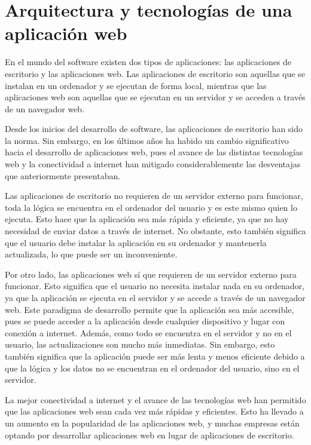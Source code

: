 \section{Arquitectura y tecnologías de una aplicación web}
\label{sec:arquitectura_sistema}

En el mundo del software existen dos tipos de aplicaciones: las aplicaciones de escritorio y las aplicaciones web. Las aplicaciones de escritorio son aquellas que se instalan en un ordenador y se ejecutan de forma local, mientras que las aplicaciones web son aquellas que se ejecutan en un servidor y se acceden a través de un navegador web.

Desde los inicios del desarrollo de software, las aplicaciones de escritorio han sido la norma. Sin embargo, en los últimos años ha habido un cambio significativo hacia el desarrollo de aplicaciones web, pues el avance de las distintas tecnologías web y la conectividad a internet han mitigado considerablemente las desventajas que anteriormente presentaban. \cite{evo_web}

Las aplicaciones de escritorio no requieren de un servidor externo para funcionar, toda la lógica se encuentra en el ordenador del usuario y es este mismo quien lo ejecuta. Esto hace que la aplicación sea más rápida y eficiente, ya que no hay necesidad de enviar datos a través de internet. No obstante, esto también significa que el usuario debe instalar la aplicación en su ordenador y mantenerla actualizada, lo que puede ser un inconveniente. \cite{web_vs_desktop}

Por otro lado, las aplicaciones web sí que requieren de un servidor externo para funcionar. Esto significa que el usuario no necesita instalar nada en su ordenador, ya que la aplicación se ejecuta en el servidor y se accede a través de un navegador web. Este paradigma de desarrollo permite que la aplicación sea más accesible, pues se puede acceder a la aplicación desde cualquier dispositivo y lugar con conexión a internet. Además, como todo se encuentra en el servidor y no en el usuario, las actualizaciones son mucho más inmediatas. Sin embargo, esto también significa que la aplicación puede ser más lenta y menos eficiente debido a que la lógica y los datos no se encuentran en el ordenador del usuario, sino en el servidor. \cite{web_vs_desktop}

La mejor conectividad a internet y el avance de las tecnologías web han permitido que las aplicaciones web sean cada vez más rápidas y eficientes. Esto ha llevado a un aumento en la popularidad de las aplicaciones web, y muchas empresas están optando por desarrollar aplicaciones web en lugar de aplicaciones de escritorio.

